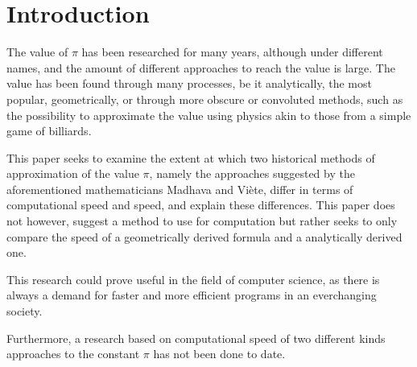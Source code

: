 \section{Introduction}


The value of $\pi$ has been researched for many years, although under different names,
and the amount of different approaches to reach the value is large. The value has been 
found through many processes, be it analytically, the most popular, geometrically, or through 
more obscure or convoluted methods, such as the possibility to approximate the value using 
physics akin to those from a simple game of billiards. \cite{galperin_2003}

This paper seeks to examine the extent at which two historical methods of
approximation of the value $\pi$, namely the approaches suggested by the aforementioned 
mathematicians Madhava and Viète, differ in terms of computational speed and 
speed, and explain these differences. This paper does not however, 
suggest a method to use for computation but rather seeks to only compare 
the speed of a geometrically derived formula and a analytically derived one. 

This research could prove useful in the field of computer science, as 
there is always a demand for faster and more efficient programs in an
everchanging society.

Furthermore, a research based on computational speed of two different 
kinds approaches to the constant $\pi$ has not been done to date.  